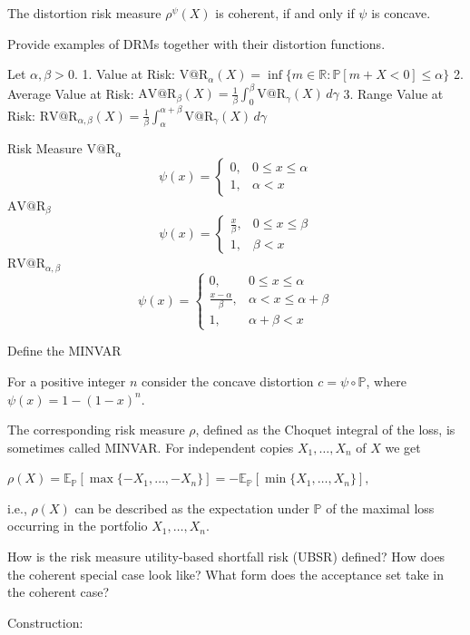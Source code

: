 {The distortion risk measure \(\rho^{\psi}(X)\) is coherent, if and only if \(\psi\) is concave.

Provide examples of DRMs together with their distortion functions.

Let \(\alpha, \beta > 0\).
1. Value at Risk: \(\text{V@R}_{\alpha}(X) = \inf\{m \in \mathbb{R} : \mathbb{P}[m + X < 0] \leq \alpha\}\)
2. Average Value at Risk: \(\text{AV@R}_{\beta}(X) = \frac{1}{\beta} \int_{0}^{\beta} \text{V@R}_{\gamma}(X) \, d\gamma\)
3. Range Value at Risk: \(\text{RV@R}_{\alpha, \beta}(X) = \frac{1}{\beta} \int_{\alpha}^{\alpha + \beta} \text{V@R}_{\gamma}(X) \, d\gamma\)

Risk Measure
\(\text{V@R}_{\alpha}\)
\[
\psi(x) = 
\begin{cases} 
0, & 0 \leq x \leq \alpha \\ 
1, & \alpha < x 
\end{cases}
\]
\(\text{AV@R}_{\beta}\)
\[
\psi(x) = 
\begin{cases} 
\frac{x}{\beta}, & 0 \leq x \leq \beta \\ 
1, & \beta < x 
\end{cases}
\]
\(\text{RV@R}_{\alpha, \beta}\)
\[
\psi(x) = 
\begin{cases} 
0, & 0 \leq x \leq \alpha \\ 
\frac{x - \alpha}{\beta}, & \alpha < x \leq \alpha + \beta \\ 
1, & \alpha + \beta < x 
\end{cases}
\]


Define the MINVAR

For a positive integer \(n\) consider the concave distortion \(c = \psi \circ \mathbb{P}\), 
where \(\psi(x) = 1 - (1 - x)^n\).

The corresponding risk measure \(\rho\), defined as the Choquet integral of the loss, is sometimes called MINVAR.
For independent copies \(X_1, \ldots, X_n\) of \(X\) we get

\(
\rho(X) = \mathbb{E}_{\mathbb{P}}[\max\{-X_1, \ldots, -X_n\}] = -\mathbb{E}_{\mathbb{P}}[\min\{X_1, \ldots, X_n\}],
\)

i.e., \(\rho(X)\) can be described as the expectation under \(\mathbb{P}\) 
of the maximal loss occurring in the portfolio \(X_1, \ldots, X_n\).

How is the risk measure utility-based shortfall risk (UBSR) defined? How does
the coherent special case look like? What form does the acceptance set take in the
coherent case?

Construction:

}
